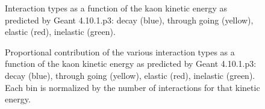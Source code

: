 \begin{figure}
\begin{minipage}[b]{0.53\textwidth}
\end{minipage}
\par
\begin{minipage}[t]{.53\textwidth}
\caption{Interaction types as a function of the kaon kinetic energy as predicted by  Geant 4.10.1.p3: decay (blue), through going (yellow), elastic (red), inelastic (green).}
\label{fig:interactionBreakdown}
\end{minipage}%
\begin{minipage}[t]{.5\textwidth}  
\caption{Proportional contribution of the various interaction types as a function of the kaon kinetic energy as predicted by  Geant 4.10.1.p3: decay (blue), through going (yellow), elastic (red), inelastic (green). Each bin is normalized by the number of interactions for that kinetic energy.}
\label{fig:interactionBreakdownPercentage}
\end{minipage}  
\end{figure}








